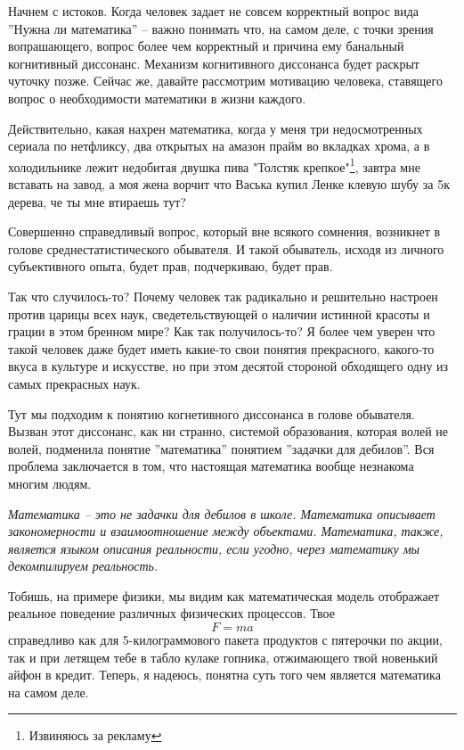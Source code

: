 Начнем с истоков.
Когда человек задает не совсем корректный вопрос вида ''Нужна ли математика'' -- важно понимать что, на самом деле,
с точки зрения вопрашающего, вопрос более чем корректный и причина ему банальный когнитивный диссонанс.
Механизм когнитивного диссонанса будет раскрыт чуточку позже.
Сейчас же, давайте рассмотрим мотивацию человека, ставящего вопрос о необходимости математики в жизни каждого.

Действительно, какая нахрен математика, когда у меня три недосмотренных сериала по нетфликсу, два открытых на амазон прайм
во вкладках хрома, а в холодильнике лежит недобитая двушка пива "Толстяк крепкое"\footnote{Извиняюсь за рекламу},
завтра мне вставать на завод, а моя жена ворчит что Васька купил Ленке клевую шубу за 5к дерева, че ты мне втираешь тут?

Совершенно справедливый вопрос, который вне всякого сомнения, возникнет в голове среднестатистического обывателя.
И такой обыватель, исходя из личного субъективного опыта, будет прав, подчеркиваю, будет прав.

Так что случилось-то?
Почему человек так радикально и решительно настроен против царицы всех наук, сведетельствующей о наличии истинной красоты
и грации в этом бренном мире?
Как так получилось-то?
Я более чем уверен что такой человек даже будет иметь какие-то свои понятия прекрасного, какого-то вкуса в культуре и искусстве,
но при этом десятой стороной обходящего одну из самых прекрасных наук.

Тут мы подходим к понятию когнетивного диссонанса в голове обывателя.
Вызван этот диссонанс, как ни странно, системой образования, которая волей не волей, подменила понятие ''математика'' понятием
''задачки для дебилов''.
Вся проблема заключается в том, что настоящая математика вообще незнакома многим людям.

\begin{displayquote}
    \textit{
        Математика -- это не задачки для дебилов в школе.
        Математика описывает закономерности и взаимоотношение между объектами.
        Математика, также, является языком описания реальности, если угодно, через математику мы декомпилируем реальность.
    }
\end{displayquote}
Тобишь, на примере физики, мы видим как математическая модель отображает реальное поведение различных физических процессов.
Твое
\[F = ma\]
справедливо как для 5-килограммового пакета продуктов с пятерочки по акции, так и при летящем тебе в табло кулаке гопника,
отжимающего твой новенький айфон в кредит.
Теперь, я надеюсь, понятна суть того чем является математика на самом деле.

